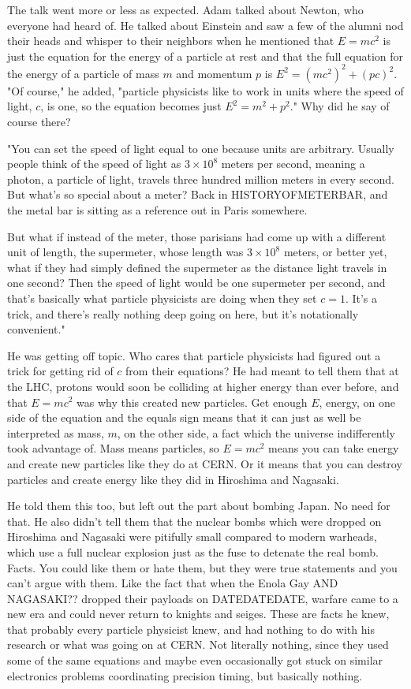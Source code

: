 \mymark

The talk went more or less as expected. Adam talked about Newton, who everyone had heard of. He talked about Einstein and saw a few of the alumni nod their heads and whisper to their neighbors when he mentioned that $E=mc^2$ is just the equation for the energy of a particle at rest and that the full equation for the energy of a particle of mass $m$ and momentum $p$ is $E^2 = (mc^2)^2 + (pc)^2$. "Of course," he added, "particle physicists like to work in units where the speed of light, $c$, is one, so the equation becomes just $E^2=m^2+p^2$." Why did he say of course there?

"You can set the speed of light equal to one because units are arbitrary. Usually people think of the speed of light as $3\times 10^8$ meters per second, meaning a photon, a particle of light, travels three hundred million meters in every second. But what's so special about a meter? Back in HISTORYOFMETERBAR, and the metal bar is sitting as a reference out in Paris somewhere.

But what if instead of the meter, those parisians had come up with a different unit of length, the supermeter, whose length was $3\times 10^8$ meters, or better yet, what if they had simply defined the supermeter as the distance light travels in one second? Then the speed of light would be one supermeter per second, and that's basically what particle physicists are doing when they set $c=1$. It's a trick, and there's really nothing deep going on here, but it's notationally convenient."

He was getting off topic. Who cares that particle physicists had figured out a trick for getting rid of $c$ from their equations? He had meant to tell them that at the LHC, protons would soon be colliding at higher energy than ever before, and that $E=mc^2$ was why this created new particles. Get enough $E$, energy, on one side of the equation and the equals sign means that it can just as well be interpreted as mass, $m$, on the other side, a fact which the universe indifferently took advantage of. Mass means particles, so $E=mc^2$ means you can take energy and create new particles like they do at CERN. Or it means that you can destroy particles and create energy like they did in Hiroshima and Nagasaki.

He told them this too, but left out the part about bombing Japan. No need for that. He also didn't tell them that the nuclear bombs which were dropped on Hiroshima and Nagasaki were pitifully small compared to modern warheads, which use a full nuclear explosion just as the fuse to detenate the real bomb. Facts. You could like them or hate them, but they were true statements and you can't argue with them. Like the fact that when the Enola Gay AND NAGASAKI?? dropped their payloads on DATEDATEDATE, warfare came to a new era and could never return to knights and seiges. These are facts he knew, that probably every particle physicist knew, and had nothing to do with his research or what was going on at CERN. Not literally nothing, since they used some of the same equations and maybe even occasionally got stuck on similar electronics problems coordinating precision timing, but basically nothing. 

